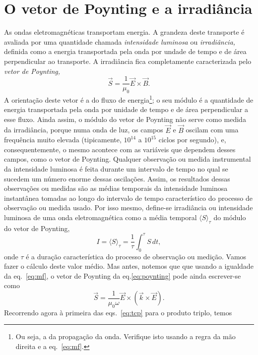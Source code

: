 \section{O vetor de Poynting e a irradiância}\label{sec:irradiance}
As ondas eletromagnéticas transportam energia. A grandeza deste transporte é
avaliada por uma quantidade chamada \emph{intensidade luminosa} ou
\emph{irradiância,} definida como a energia transportada pela onda por undade de
tempo e de área perpendicular ao transporte. A irradiância fica completamente
caracterizada pelo \emph{vetor de Poynting,}
\begin{equation}\label{eq:poynting}
  \vec S=\frac{1}{\mu_0}\vec E\times\vec B.
\end{equation}
A orientação deste vetor é a do fluxo de energia\footnote{Ou seja, a da
propagação da onda. Verifique isto usando a regra da mão direita e a
eq.~\eqref{eq:mf}.}; o seu módulo é a quantidade de energia transportada pela
onda por unidade de tempo e de área perpendicular a esse fluxo. Ainda assim, o
módulo do vetor de Poynting não serve como medida da irradiância, porque
numa onda de luz, os campos $\vec E$ e $\vec B$ oscilam com uma frequência muito
elevada (tipicamente, $10^{14}$ a $10^{15}$ ciclos por segundo), e,
consequentemente, o mesmo acontece com as variáveis que dependem desses campos,
como o vetor de Poynting. Qualquer observação ou medida instrumental da
intensidade luminosa é feita durante um intervalo de tempo no qual se sucedem um
número enorme dessas oscilações. Assim, os resultados dessas observações ou
medidas são as médias temporais da intensidade luminosa instantânea tomadas ao
longo do intervalo de tempo característico do processo de observação ou medida
usado. Por isso mesmo, define-se irradiância ou intensidade luminosa de uma onda
eletromagnética como a média temporal $\langle S\rangle_\tau$ do módulo do vetor
de Poynting,
\begin{equation}\label{eq:irrad}
I=\langle S\rangle_\tau
=\frac{1}{\tau}\int_0^\tau S\,dt,
\end{equation}
onde $\tau$ é a duração característica do processo de observação ou medição.
Vamos fazer o cálculo deste valor médio. Mas antes, notemos que que usando a
igualdade da eq.~\eqref{eq:mf}, o vetor de Poynting da eq.\eqref{eq:poynting}
pode ainda escrever-se como
\begin{equation*}
\vec S=\frac{1}{\mu_0\omega}\vec E\times(\vec k\times\vec E).
\end{equation*}
Recorrendo agora à primeira das eqs.~\eqref{eq:tcp} para o produto triplo, temos
